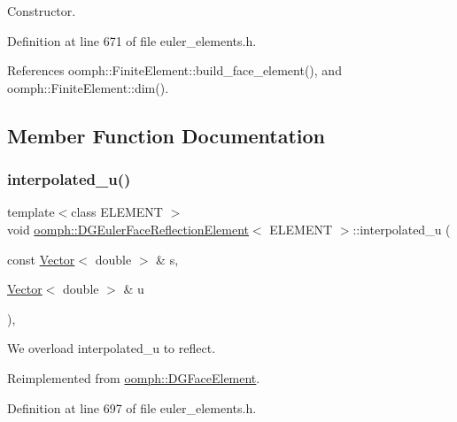 Constructor. 



Definition at line 671 of file euler\+\_\+elements.\+h.



References oomph\+::\+Finite\+Element\+::build\+\_\+face\+\_\+element(), and oomph\+::\+Finite\+Element\+::dim().



\subsection{Member Function Documentation}
\mbox{\label{classoomph_1_1DGEulerFaceReflectionElement_a288fa54f9022aac4bf060ca19a0c8a67}} 
\subsubsection{\texorpdfstring{interpolated\+\_\+u()}{interpolated\_u()}}
{\footnotesize\ttfamily template$<$class E\+L\+E\+M\+E\+NT $>$ \\
void \hyperlink{classoomph_1_1DGEulerFaceReflectionElement}{oomph\+::\+D\+G\+Euler\+Face\+Reflection\+Element}$<$ E\+L\+E\+M\+E\+NT $>$\+::interpolated\+\_\+u (\begin{DoxyParamCaption}\item[{const \hyperlink{classoomph_1_1Vector}{Vector}$<$ double $>$ \&}]{s,  }\item[{\hyperlink{classoomph_1_1Vector}{Vector}$<$ double $>$ \&}]{u }\end{DoxyParamCaption})\hspace{0.3cm}{\ttfamily [inline]}, {\ttfamily [virtual]}}



We overload interpolated\+\_\+u to reflect. 



Reimplemented from \hyperlink{classoomph_1_1DGFaceElement_ab58cee592775f0ae54ac0b0087eb9d35}{oomph\+::\+D\+G\+Face\+Element}.



Definition at line 697 of file euler\+\_\+elements.\+h.



